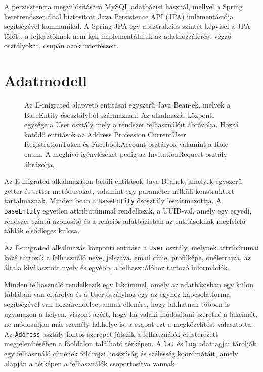 A perzisztencia megvalósítására MySQL adatbázist használ, mellyel a Spring keretrendszer által biztosított Java Persistence API (JPA) imlementációja segítségével kommunikál. A Spring JPA egy absztrakciós szintet képvisel a JPA fölött, a fejlesztőknek nem kell implementálniuk az adathozzáférést végző osztályokat, csupán azok interfészeit. 



\section{Adatmodell}\label{sec:projektrol:adatmodell}
\begin{figure}[!b]
  \centering
  \caption{Az E-migrated alapvető entitásai egyszerű Java Bean-ek, melyek a BaseEntity ősosztályból származnak. Az alkalmazás központi egysége a User osztály\protect{,} mely a rendszer felhasználóit ábrázolja. Hozzá kötődő entitások az Address\protect{,} Profession\protect{,} CurrentUser\protect{,} RegistrationToken és FacebookAccount osztályok\protect{,} valamint a Role enum. A meghívó igényléseket pedig az InvitationRequest osztály ábrázolja.}
  \label{fig:adatmodell}
\end{figure}
Az E-migrated alkalmazáson belüli entitások Java Beanek, amelyek egyszerű getter és setter
metódusokat, valamint egy paraméter nélküli konstruktort tartalmaznak. Minden bean a \texttt{BaseEntity} ősosztály leszármazottja. A \texttt{BaseEntity} egyetlen attributúmmal rendelkezik, a UUID-val, amely egy egyedi, rendszer szintű azonosító és a relációs adatbázisban az entitásoknak megfelelő táblák elsődleges kulcsa. 

Az E-migrated alkalmazás központi entitása a \texttt{User} osztály,  melynek attribútumai közé tartozik a felhasználó neve, jelszava, email címe, profilképe, önéletrajza, az általa kiválasztott nyelv és egyébb, a felhasználóhoz tartozó információk. 



Minden felhasználó rendelkezik egy lakcímmel, amely az adatbázisban egy külön táblában van eltárolva és a User oszályhoz egy az egyhez kapcsolatforma segítségével van hozzárendelve, annak ellenére, hogy lakhatnak többen is ugyanazon a helyen, viszont azért, hogy ha valaki módosítani szeretné a lakcímét, ne módosuljon más személy lakhelye is, a csapat ezt a megközelítést választotta. Az \texttt{Address} osztály fontos szerepet játszik a felhasználók clusterezett megjelenítésében a főoldalon található térképen. A \texttt{lat} és \texttt{lng} adattagjai tárolják egy felhasználó címének földrajzi hosszúság és szélesség koordinátáit, amely alapján a térképen a felhasználók csoportosítva vannak. 

